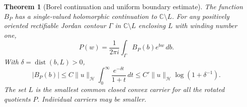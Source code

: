 \documentclass[11pt,a4paper]{article}
\numberwithin{equation}{section}
\newtheorem{theorem}{Theorem}[section]
\theoremstyle{definition}
\theoremstyle{remark}
\newcommand{\C}{\mathbb C}
\newcommand{\Hh}{\mathcal H}
\newcommand{\norm}[1]{\lVert #1\rVert}
\begin{document}
\begin{theorem}[Borel continuation and uniform boundary estimate]\label{thm:Borel}
The function $B_P$ has a single-valued holomorphic continuation to $\C\setminus L$. For any positively oriented rectifiable Jordan contour $\Gamma$ in $\C\setminus L$ enclosing $L$ with winding number one,
\begin{equation}\label{eq:B-inversion}
 P(w)=\frac1{2\pi i}\int_\Gamma B_P(b)e^{bw}\,db.
\end{equation}
With $\delta=\operatorname{dist}(b,L)>0$,
\begin{equation}\label{eq:B-bound}
 |B_P(b)|\le C\norm{u}_{\Hh}
       \int_0^\infty\frac{e^{-\delta t}}{1+t}\,dt
 \le C'\norm{u}_{\Hh}\log(1+\delta^{-1}).
\end{equation}
The set $L$ is the smallest common closed convex carrier for all the rotated quotients $P$. Individual carriers may be smaller.
\end{theorem}
\end{document}
